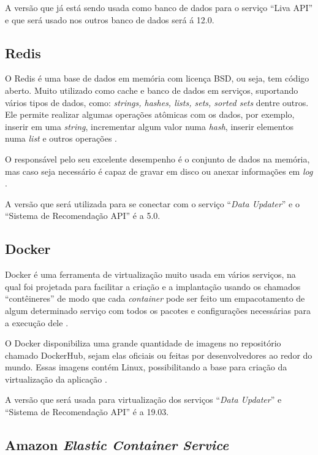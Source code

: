 A versão que já está sendo usada como banco de dados para o serviço “Liva API” e que será usado nos outros banco de dados será á 12.0.

\subsection{Redis}

O Redis é uma base de dados em memória com licença BSD, ou seja, tem código aberto. Muito utilizado como cache e banco de dados em serviços, suportando vários tipos de dados, como: \textit{strings, hashes, lists, sets, sorted sets} dentre outros. Ele permite realizar algumas operações atômicas com os dados, por exemplo, inserir em uma \textit{string}, incrementar algum valor numa \textit{hash}, inserir elementos numa \textit{list} e outros operações \cite{redis:2019}.

O responsável pelo seu excelente desempenho é o conjunto de dados na memória, mas caso seja necessário é capaz de gravar em disco ou anexar informações em \textit{log} \cite{redis:2019}.

A versão que será utilizada para se conectar com o serviço “\textit{Data Updater}” e o “Sistema de Recomendação API” é a 5.0.

\subsection{Docker}

Docker é uma ferramenta de virtualização muito usada em vários serviços, na qual foi projetada para facilitar a criação e a implantação usando os chamados “contêineres” de modo que cada \textit{container} pode ser feito um empacotamento de algum determinado serviço com todos os pacotes e configurações necessárias para a execução dele \cite{OPENSOURCE.COM:2019}.

O Docker disponibiliza uma grande quantidade de imagens no repositório chamado DockerHub, sejam elas oficiais ou feitas por desenvolvedores ao redor do mundo. Essas imagens contém Linux, possibilitando a base para criação da virtualização da aplicação \cite{DOCKERHUB:2019}.

A versão que será usada para virtualização dos serviços “\textit{Data Updater}” e “Sistema de Recomendação API” é a 19.03.

\subsection{Amazon \textit{Elastic Container Service}}

